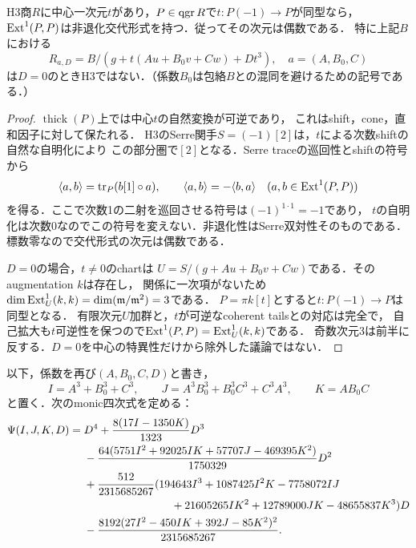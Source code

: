 \begin{lemma}[反Serre固定点の奇数接空間障害]
\label{lem:odd-point-tangent-obstruction}
H3商$R$に中心一次元$t$があり，$P\in\operatorname{qgr} R$で$t:P(-1)\to P$が同型なら，
$\operatorname{Ext}^1(P,P)$は非退化交代形式を持つ．従ってその次元は偶数である．
特に上記$B$における
\[
 R_{a,D}=B/(g+t(Au+B_0v+Cw)+Dt^3),\quad a=(A,B_0,C)
\]
は$D=0$のときH3ではない．（係数$B_0$は包絡$B$との混同を避けるための記号である．）
\end{lemma}
\begin{proof}
$\operatorname{thick}(P)$上では中心$t$の自然変換が可逆であり，
これはshift，cone，直和因子に対して保たれる．
H3のSerre関手$S=(-1)[2]$は，$t$による次数shiftの自然な自明化により
この部分圏で$[2]$となる．Serre traceの巡回性とshiftの符号から
\[
 \langle a,b\rangle=\operatorname{tr}_P(b[1]\circ a),\qquad
 \langle a,b\rangle=-\langle b,a\rangle
 \quad(a,b\in\operatorname{Ext}^1(P,P))
\]
を得る．ここで次数1の二射を巡回させる符号は$(-1)^{1\cdot1}=-1$であり，
$t$の自明化は次数0なのでこの符号を変えない．非退化性はSerre双対性そのものである．
標数零なので交代形式の次元は偶数である．

$D=0$の場合，$t\ne0$のchartは
$U=S/(g+Au+B_0v+Cw)$である．そのaugmentation $k$は存在し，
関係に一次項がないため
$\dim\operatorname{Ext}^1_U(k,k)=\dim(\mathfrak m/\mathfrak m^2)=3$である．
$P=\pi k[t]$とすると$t:P(-1)\to P$は同型となる．
有限次元$U$加群と，$t$が可逆なcoherent tailsとの対応は完全で，
自己拡大も$t$可逆性を保つので$\operatorname{Ext}^1(P,P)=\operatorname{Ext}^1_U(k,k)$である．
奇数次元3は前半に反する．$D=0$を中心の特異性だけから除外した議論ではない．
\end{proof}

以下，係数を再び$(A,B_0,C,D)$と書き，
\[
 I=A^3+B_0^3+C^3,\qquad
 J=A^3B_0^3+B_0^3C^3+C^3A^3,\qquad K=AB_0C
\]
と置く．次のmonic四次式を定める：
\begin{align*}
 \Psi(I,J,K,D)={}&D^4+\frac{8(17I-1350K)}{1323}D^3\\
 &-\frac{64(5751I^2+92025IK+57707J-469395K^2)}{1750329}D^2\\
 &+\frac{512}{2315685267}
 (194643I^3+1087425I^2K-7758072IJ\\
 &\hspace{28mm}+21605265IK^2+12789000JK-48655837K^3)D\\
 &-\frac{8192(27I^2-450IK+392J-85K^2)^2}{2315685267}.
\end{align*}

